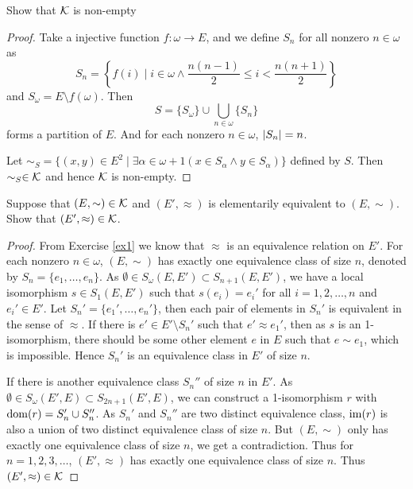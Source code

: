 \documentclass[11pt]{article}
\begin{document}
\begin{exercise}
Show that \(\mathcal{K}\) is non-empty
\end{exercise}

\begin{proof}
Take a injective function \(f:\omega\to E\), and we define \(S_n\) for all nonzero \(n\in\omega\)
as
\begin{equation*}
S_n=\left\{f(i)\mid i\in\omega\wedge\frac{n(n-1)}{2}\le i<\frac{n(n+1)}{2}\right\}
\end{equation*}
and \(S_\omega=E\setminus f(\omega)\). Then
\begin{equation*}
S=\{S_\omega\}\cup\bigcup_{n\in\omega}\{S_n\}
\end{equation*}
forms a partition of \(E\). And for each nonzero \(n\in\omega\), \(\abs{S_n}=n\).

Let \(\sim_S=\{(x,y)\in E^2\mid \exists \alpha\in\omega+1(x\in S_\alpha\wedge y\in S_\alpha)\}\) defined by \(S\). Then
\(\sim_S\in\mathcal{K}\) and hence \(\mathcal{K}\) is non-empty.
\end{proof}

\begin{exercise}
Suppose that \((E,\sim)\in\mathcal{K}\) and \((E',\approx)\) is elementarily equivalent to \((E,\sim)\). Show
that \((E',\approx)\in\mathcal{K}\).
\end{exercise}

\begin{proof}
From Exercise \ref{ex1} we know that \(\approx\) is an equivalence relation on \(E'\). For each
nonzero \(n\in\omega\), \((E,\sim)\) has exactly one equivalence class of size \(n\), denoted by \(S_n=\{e_1,\dots,e_n\}\).
As \(\emptyset\in S_\omega(E,E')\subset S_{n+1}(E,E')\), we have a local isomorphism \(s\in S_1(E,E')\) such
that \(s(e_i)=e_i'\) for all \(i=1,2,\dots,n\) and \(e_i'\in E'\). Let \(S_n'=\{e_1',\dots,e_n'\}\), then each pair
of elements in \(S_n'\) is equivalent in the sense of \(\approx\). If there is \(e'\in E'\setminus S_n'\) such
that \(e'\approx e_1'\), then as \(s\) is an 1-isomorphism, there should be some other element \(e\)
in \(E\) such that \(e\sim e_1\), which is impossible. Hence \(S_n'\) is an equivalence class in \(E'\)
of size \(n\).

If there is another equivalence class \(S_n''\) of size \(n\) in \(E'\).
As \(\emptyset\in S_\omega(E',E)\subset S_{2n+1}(E',E)\), we can construct a 1-isomorphism \(r\)
with \(\operatorname{dom}(r)=S_n'\cup S_n''\). As \(S_n'\) and \(S_n''\) are two distinct equivalence
class, \(\operatorname{im}(r)\) is also a union of two distinct equivalence class of size \(n\). But \((E,\sim)\)
only has exactly one equivalence class of size \(n\), we get a contradiction. Thus
for \(n=1,2,3,\dots\), \((E',\approx)\) has exactly one equivalence class of size \(n\). Thus \((E',\approx)\in\mathcal{K}\)
\end{proof}
\end{document}
